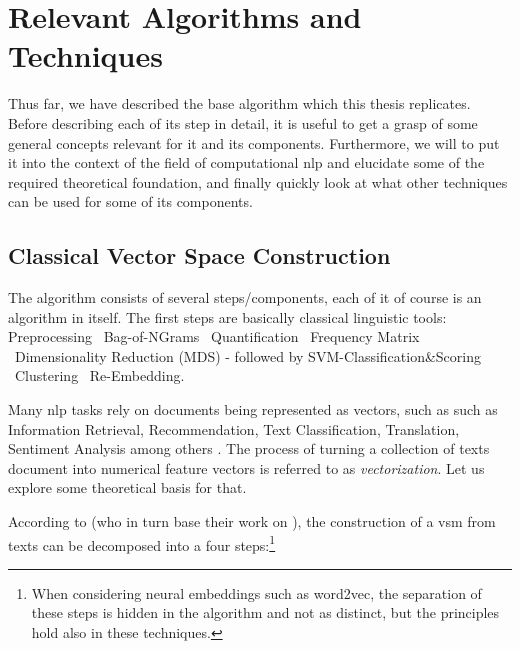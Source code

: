 \section{Relevant Algorithms and Techniques}
\label{sec:required_algos}


Thus far, we have described the base algorithm which this thesis replicates. Before describing each of its step in detail, it is useful to get a grasp of some general concepts relevant for it and its components. Furthermore, we will to put it into the context of the field of computational \gls{nlp} and elucidate some of the required theoretical foundation, and finally quickly look at what other techniques can be used for some of its components. 

\subsection{Classical Vector Space Construction}


The algorithm consists of several steps/components, each of it of course is an algorithm in itself. The first steps are basically classical linguistic tools: Preprocessing \textrightarrow ~Bag-of-NGrams \textrightarrow ~Quantification \textrightarrow ~Frequency Matrix \textrightarrow ~Dimensionality Reduction (MDS) - followed by SVM-Classification\&Scoring \textrightarrow ~Clustering \textrightarrow ~Re-Embedding.

Many \gls{nlp} tasks rely on documents being represented as vectors, such as such as Information Retrieval, Recommendation, Text Classification, Translation, Sentiment Analysis among others \cite{Smith2017,bird2009natural,Devlin2019,Le2014,Mikolov2013a,Turney2010,Guo,Chen2018,Maas2011}. The process of turning a collection of texts document into numerical feature vectors is referred to as \textit{vectorization}. Let us explore some theoretical basis for that.

According to \textcite{Turney2010} (who in turn base their work on \textcite{Lowe}), the construction of a \gls{vsm} from texts can be decomposed into a four steps:\footnote{When considering neural embeddings such as \gls{word2vec}, the separation of these steps is hidden in the algorithm and not as distinct, but the principles hold also in these techniques.}

